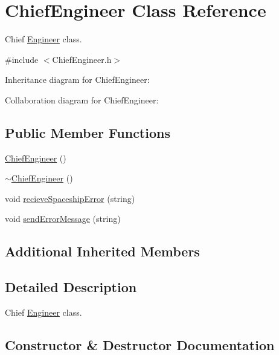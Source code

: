 \hypertarget{classChiefEngineer}{}\section{Chief\+Engineer Class Reference}
\label{classChiefEngineer}


Chief \hyperlink{classEngineer}{Engineer} class.  




{\ttfamily \#include $<$Chief\+Engineer.\+h$>$}



Inheritance diagram for Chief\+Engineer\+:


Collaboration diagram for Chief\+Engineer\+:
\subsection*{Public Member Functions}
\begin{DoxyCompactItemize}
\item 
\hyperlink{classChiefEngineer_a4bd0e5f9075ad0ac1a15047c152fe2cb}{Chief\+Engineer} ()
\item 
\hyperlink{classChiefEngineer_aa647c8d8f2d872dc3838211725fd05db}{$\sim$\+Chief\+Engineer} ()
\item 
void \hyperlink{classChiefEngineer_a7170ae93d7eadc1a68bc86c25a9be0db}{recieve\+Spaceship\+Error} (string)
\item 
void \hyperlink{classChiefEngineer_afe5a4677f7651fff2926c0583875a666}{send\+Error\+Message} (string)
\end{DoxyCompactItemize}
\subsection*{Additional Inherited Members}


\subsection{Detailed Description}
Chief \hyperlink{classEngineer}{Engineer} class. 

\subsection{Constructor \& Destructor Documentation}
\mbox{\label{classChiefEngineer_a4bd0e5f9075ad0ac1a15047c152fe2cb}} 
